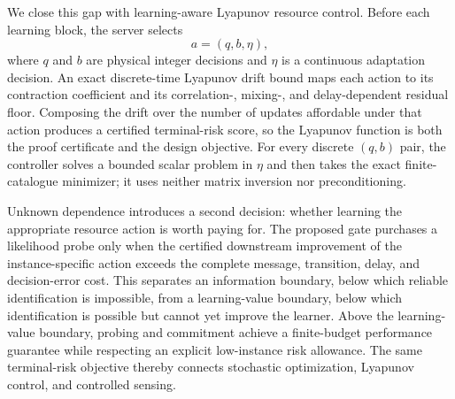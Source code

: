 \documentclass[journal]{IEEEtran}
\begin{document}
We close this gap with learning-aware Lyapunov resource control.
Before each learning block, the server selects
\begin{equation}
a=(q,b,\eta),
\label{eq:resource-action-intro}
\end{equation}
where $q$ and $b$ are physical integer decisions and $\eta$ is a continuous adaptation decision.
An exact discrete-time Lyapunov drift bound maps each action to its contraction coefficient and its correlation-, mixing-, and delay-dependent residual floor.
Composing the drift over the number of updates affordable under that action produces a certified terminal-risk score, so the Lyapunov function is both the proof certificate and the design objective.
For every discrete $(q,b)$ pair, the controller solves a bounded scalar problem in $\eta$ and then takes the exact finite-catalogue minimizer; it uses neither matrix inversion nor preconditioning.

Unknown dependence introduces a second decision: whether learning the appropriate resource action is worth paying for.
The proposed gate purchases a likelihood probe only when the certified downstream improvement of the instance-specific action exceeds the complete message, transition, delay, and decision-error cost.
This separates an information boundary, below which reliable identification is impossible, from a learning-value boundary, below which identification is possible but cannot yet improve the learner.
Above the learning-value boundary, probing and commitment achieve a finite-budget performance guarantee while respecting an explicit low-instance risk allowance.
The same terminal-risk objective thereby connects stochastic optimization, Lyapunov control, and controlled sensing.
\end{document}
